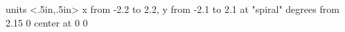 

\beginpicture
  \setcoordinatesystem units <.5in,.5in>
  \setplotarea x from -2.2 to 2.2, y from -2.1 to 2.1 
  at  "spiral"
  degrees from  2.15  0
    center at 0 0 
\endpicture
